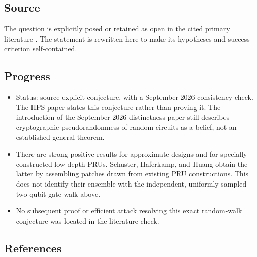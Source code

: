 \subsection*{Source}

The question is explicitly posed or retained as open in the cited primary literature . The statement is rewritten here to make its hypotheses and success criterion self-contained.

\subsection*{Progress}

\begin{itemize}
  \item Status: source-explicit conjecture, with a September 2026 consistency check. The HPS paper states this conjecture rather than proving it. The introduction of the September 2026 distinctness paper still describes cryptographic pseudorandomness of random circuits as a belief, not an established general theorem. 

  \item There are strong positive results for approximate designs and for specially constructed low-depth PRUs. Schuster, Haferkamp, and Huang obtain the latter by assembling patches drawn from existing PRU constructions. This does not identify their ensemble with the independent, uniformly sampled two-qubit-gate walk above. 

  \item No subsequent proof or efficient attack resolving this exact random-walk conjecture was located in the literature check.
\end{itemize}

\subsection*{References}

